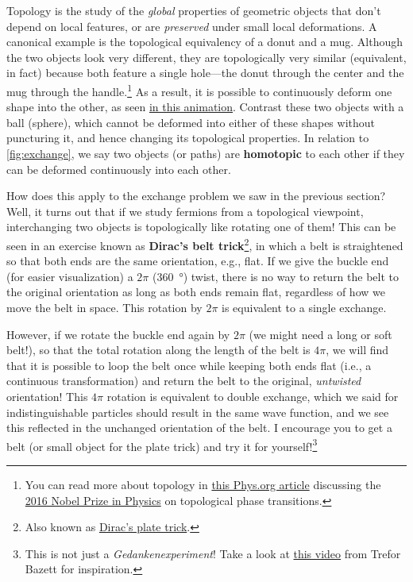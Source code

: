 \documentclass[12pt, english]{book}
\begin{document}
Topology is the study of the \emph{global} properties of geometric objects that don't depend on local features, or are \emph{preserved} under small local deformations.
A canonical example is the topological equivalency of a donut and a mug.
Although the two objects look very different, they are topologically very similar (equivalent, in fact) because both feature a single hole---the donut through the center and the mug through the handle.\footnote{You can read more about topology in \href{https://phys.org/news/2016-10-coffee-donut-topology.html}{this Phys.org article} discussing the \href{https://www.nobelprize.org/prizes/physics/2016/summary/}{2016 Nobel Prize in Physics} on topological phase transitions.}
As a result, it is possible to continuously deform one shape into the other, as seen \href{https://tex.stackexchange.com/questions/210255/torus-to-coffee-mug-homotopy}{in this animation}.
Contrast these two objects with a ball (sphere), which cannot be deformed into either of these shapes without puncturing it, and hence changing its topological properties.
In relation to \autoref{fig:exchange}, we say two objects (or paths) are \textbf{homotopic} to each other if they can be deformed continuously into each other.

How does this apply to the exchange problem we saw in the previous section?
Well, it turns out that if we study fermions from a topological viewpoint, interchanging two objects is topologically like rotating one of them!
This can be seen in an exercise known as \textbf{Dirac's belt trick}\footnote{Also known as \href{https://en.wikipedia.org/wiki/Plate_trick}{Dirac's plate trick}.}, in which a belt is straightened so that both ends are the same orientation, e.g., flat.
If we give the buckle end (for easier visualization) a $2\pi$ (\SI{360}{\degree}) twist, there is no way to return the belt to the original orientation as long as both ends remain flat, regardless of how we move the belt in space.
This rotation by $2\pi$ is equivalent to a single exchange.

However, if we rotate the buckle end again by $2\pi$ (we might need a long or soft belt!), so that the total rotation along the length of the belt is $4\pi$, we will find that it is possible to loop the belt once while keeping both ends flat (i.e., a continuous transformation) and return the belt to the original, \emph{untwisted} orientation!
This $4\pi$ rotation is equivalent to double exchange, which we said for indistinguishable particles should result in the same wave function, and we see this reflected in the unchanged orientation of the belt.
I encourage you to get a belt (or small object for the plate trick) and try it for yourself!\footnote{This is not just a \emph{Gedankenexperiment}! Take a look at \href{https://www.youtube.com/watch?v=EgsUDby0X1M}{this video} from Trefor Bazett for inspiration.}
\end{document}
